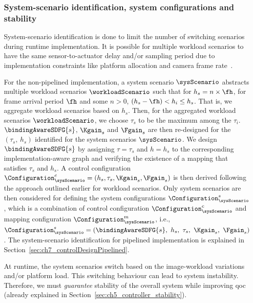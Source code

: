 \subsubsection{System-scenario identification,  system configurations and stability}
\label{sec:ch7_sysConfigStability}
System-scenario identification is done to limit the number of switching scenarios during runtime implementation.
It is possible for multiple workload scenarios to have the same sensor-to-actuator delay and/or sampling period due to implementation constraints like platform allocation and camera frame rate~\cite{mohamed2019designing}.

For the non-pipelined implementation, a system scenario $\sysScenario$ abstracts multiple workload scenarios $\workloadScenario$ such that for $h_s=n\times \fh$, for frame arrival period $\fh$ and some $n>0$, $(h_s-\fh) < h_i \leq h_s$. That is, we aggregate workload scenarios based on $h_s$. Then, for the aggregated workload scenarios $\workloadScenario$, we choose $\tau_s$ to be the maximum among the $\tau_i$.
$\bindingAwareSDFG{s}$, $\Kgain_s$ and $\Fgain_s$ are then re-designed for the $(\tau_s,\ h_s)$ identified for the system scenarios $\sysScenario$.
We design $\bindingAwareSDFG{s}$ by assigning $\tau=\tau_s$ and $h=h_s$ to the corresponding implementation-aware graph and verifying the existence of a mapping that satisfies $\tau_s$ and $h_s$. 
A control configuration $\Configuration_{\sysScenario}^c = (h_{s},\tau_{s}, \Kgain_{s}, \Fgain_{s})$ is then derived following the approach outlined earlier for workload scenarios.
Only system scenarios are then considered for defining the system configurations $\Configuration_{\sysScenario}^s$, which is a combination of control configuration $\Configuration_{\sysScenario}^c$ and mapping configuration $\Configuration_{\sysScenario}^m$, i.e., $\Configuration_{\sysScenario}^s = (\bindingAwareSDFG{s},\ h_{s},\ \tau_{s},\ \Kgain_{s},\ \Fgain_{s})$.
The system-scenario identification for pipelined implementation is explained in Section~\ref{sec:ch7_controlDesignPipelined}.

At runtime, the system scenarios switch based on the image-workload variations and/or platform load. 
This switching behaviour can lead to system instability. Therefore, we must \emph{guarantee} stability of the overall system while improving \gls{qoc} (already explained in Section~\ref{sec:ch5_controller_stability}).

